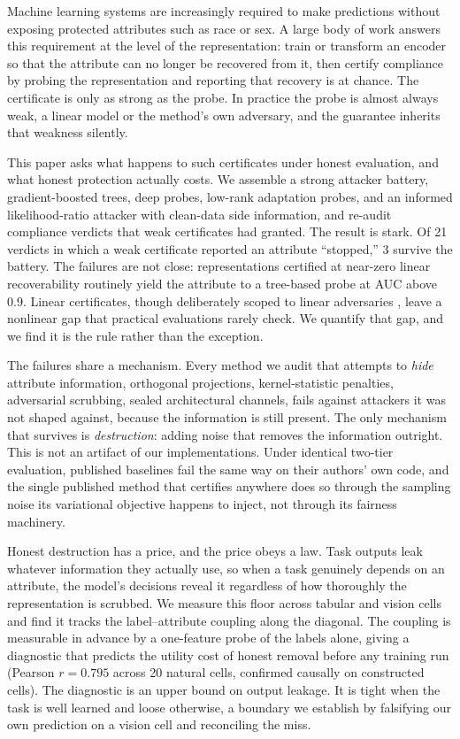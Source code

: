 \documentclass[letterpaper]{article} %
\begin{document}
Machine learning systems are increasingly required to make predictions without exposing protected attributes such as race or sex. A large body of work answers this requirement at the level of the representation: train or transform an encoder so that the attribute can no longer be recovered from it, then certify compliance by probing the representation and reporting that recovery is at chance. The certificate is only as strong as the probe. In practice the probe is almost always weak, a linear model or the method's own adversary, and the guarantee inherits that weakness silently.

This paper asks what happens to such certificates under honest evaluation, and what honest protection actually costs. We assemble a strong attacker battery, gradient-boosted trees, deep probes, low-rank adaptation probes, and an informed likelihood-ratio attacker with clean-data side information, and re-audit compliance verdicts that weak certificates had granted. The result is stark. Of 21 verdicts in which a weak certificate reported an attribute ``stopped,'' 3 survive the battery. The failures are not close: representations certified at near-zero linear recoverability routinely yield the attribute to a tree-based probe at AUC above 0.9. Linear certificates, though deliberately scoped to linear adversaries \citep{belrose2023leace}, leave a nonlinear gap that practical evaluations rarely check. We quantify that gap, and we find it is the rule rather than the exception.

The failures share a mechanism. Every method we audit that attempts to \emph{hide} attribute information, orthogonal projections, kernel-statistic penalties, adversarial scrubbing, sealed architectural channels, fails against attackers it was not shaped against, because the information is still present. The only mechanism that survives is \emph{destruction}: adding noise that removes the information outright. This is not an artifact of our implementations. Under identical two-tier evaluation, published baselines fail the same way on their authors' own code, and the single published method that certifies anywhere does so through the sampling noise its variational objective happens to inject, not through its fairness machinery.

Honest destruction has a price, and the price obeys a law. Task outputs leak whatever information they actually use, so when a task genuinely depends on an attribute, the model's decisions reveal it regardless of how thoroughly the representation is scrubbed. We measure this floor across tabular and vision cells and find it tracks the label--attribute coupling along the diagonal. The coupling is measurable in advance by a one-feature probe of the labels alone, giving a diagnostic that predicts the utility cost of honest removal before any training run (Pearson $r=0.795$ across 20 natural cells, confirmed causally on constructed cells). The diagnostic is an upper bound on output leakage. It is tight when the task is well learned and loose otherwise, a boundary we establish by falsifying our own prediction on a vision cell and reconciling the miss.
\end{document}
